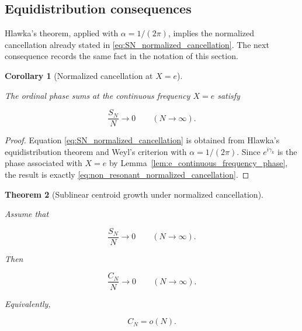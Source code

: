 \documentclass[11pt]{amsart}
\numberwithin{equation}{section}
\theoremstyle{plain}
\newtheorem{theorem}{Theorem}[section]
\newtheorem{corollary}[theorem]{Corollary}
\theoremstyle{definition}
\theoremstyle{remark}
\begin{document}
\subsection{Equidistribution consequences}
\label{subsec:equidistribution_consequences_non_resonant}

Hlawka's theorem, applied with \(\alpha=1/(2\pi)\), implies the
normalized cancellation already stated in \eqref{eq:SN_normalized_cancellation}.
The next consequence records the same fact in the notation of this
section.

\begin{corollary}[Normalized cancellation at \(X=e\)]
\label{cor:non_resonant_normalized_cancellation}

The ordinal phase sums at the continuous frequency \(X=e\) satisfy

\begin{equation}
\frac{S_N}{N}\longrightarrow 0
\qquad
(N\to\infty).
\label{eq:non_resonant_normalized_cancellation}
\end{equation}

\end{corollary}

\begin{proof}
Equation \eqref{eq:SN_normalized_cancellation} is obtained from Hlawka's
equidistribution theorem and Weyl's criterion with
\(\alpha=1/(2\pi)\). Since \(e^{i\gamma_k}\) is the phase associated with
\(X=e\) by Lemma~\ref{lem:e_continuous_frequency_phase}, the result is
exactly \eqref{eq:non_resonant_normalized_cancellation}.
\end{proof}



\begin{theorem}[Sublinear centroid growth under normalized cancellation]
\label{thm:sublinear_centroid_growth}

Assume that

\begin{equation}
\frac{S_N}{N}\longrightarrow 0
\qquad
(N\to\infty).
\label{eq:sublinear_centroid_assumption}
\end{equation}

Then

\begin{equation}
\frac{C_N}{N}\longrightarrow 0
\qquad
(N\to\infty).
\label{eq:sublinear_centroid_conclusion_normalized}
\end{equation}

Equivalently,

\begin{equation}
C_N=o(N).
\label{eq:sublinear_centroid_conclusion_little_o}
\end{equation}

\end{theorem}
\end{document}
